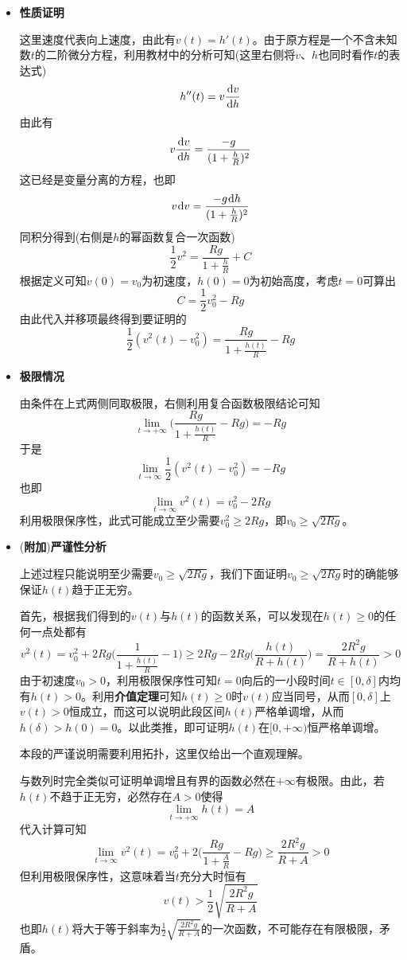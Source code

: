 \documentclass[a4paper,UTF8,fontset=windows,AutoFakeBold]{ctexart}
\newcommand*{\dr}{\hspace{0.07em}\mathrm{d}}
\newcommand*{\extra}{\textbf{附加}}
\newcommand*{\note}{\noindent *}
\theoremstyle{ex}
\begin{document}
\begin{enumerate}
{\begin{itemize}
            \item \textbf{性质证明}
            
            这里速度代表向上速度，由此有$v(t)=h'(t)$。由于原方程是一个不含未知数$t$的二阶微分方程，利用教材中的分析可知(这里右侧将$v$、$h$也同时看作$t$的表达式)
            $$h''(t)=v\frac{\dr v}{\dr h}$$
            由此有
            $$v\frac{\dr v}{\dr h}=\frac{-g}{(1+\frac{h}{R})^2}$$
            这已经是变量分离的方程，也即
            $$v\dr v=\frac{-g\dr h}{(1+\frac{h}{R})^2}$$
            同积分得到(右侧是$h$的幂函数复合一次函数)
            $$\frac{1}{2}v^2=\frac{Rg}{1+\frac{h}{R}}+C$$
            根据定义可知$v(0)=v_0$为初速度，$h(0)=0$为初始高度，考虑$t=0$可算出
            $$C=\frac{1}{2}v_0^2-Rg$$
            由此代入并移项最终得到要证明的
            $$\frac{1}{2}(v^2(t)-v_0^2)=\frac{Rg}{1+\frac{h(t)}{R}}-Rg$$

            \item \textbf{极限情况}
            
            由条件在上式两侧同取极限，右侧利用复合函数极限结论可知
            $$\lim_{t\to+\infty}\bigg(\frac{Rg}{1+\frac{h(t)}{R}}-Rg\bigg)=-Rg$$
            于是
            $$\lim_{t\to\infty}\frac{1}{2}(v^2(t)-v_0^2)=-Rg$$
            也即
            $$\lim_{t\to\infty}v^2(t)=v_0^2-2Rg$$
            利用极限保序性，此式可能成立至少需要$v_0^2\ge 2Rg$，即$v_0\ge\sqrt{2Rg}$。

            \item (\extra)\textbf{严谨性分析}
            
            上述过程只能说明至少需要$v_0\ge\sqrt{2Rg}$，我们下面证明$v_0\ge\sqrt{2Rg}$时的确能够保证$h(t)$趋于正无穷。

            首先，根据我们得到的$v(t)$与$h(t)$的函数关系，可以发现在$h(t)\ge0$的任何一点处都有
            $$v^2(t)=v_0^2+2Rg\bigg(\frac{1}{1+\frac{h(t)}{R}}-1\bigg)\ge2Rg-2Rg\bigg(\frac{h(t)}{R+h(t)}\bigg)=\frac{2R^2g}{R+h(t)}>0$$
            由于初速度$v_0>0$，利用极限保序性可知$t=0$向后的一小段时间$t\in[0,\delta]$内均有$h(t)>0$。利用\textbf{介值定理}可知$h(t)\ge0$时$v(t)$应当同号，从而$[0,\delta]$上$v(t)>0$恒成立，而这可以说明此段区间$h(t)$严格单调增，从而$h(\delta)>h(0)=0$。以此类推，即可证明$h(t)$在$[0,+\infty)$恒严格单调增。

            \note 本段的严谨说明需要利用拓扑，这里仅给出一个直观理解。

            与数列时完全类似可证明单调增且有界的函数必然在$+\infty$有极限。由此，若$h(t)$不趋于正无穷，必然存在$A>0$使得
            $$\lim_{t\to+\infty}h(t)=A$$
            代入计算可知
            $$\lim_{t\to\infty}v^2(t)=v_0^2+2\bigg(\frac{Rg}{1+\frac{A}{R}}-Rg\bigg)\ge\frac{2R^2g}{R+A}>0$$
            但利用极限保序性，这意味着当$t$充分大时恒有
            $$v(t)>\frac{1}{2}\sqrt{\frac{2R^2g}{R+A}}$$
            也即$h(t)$将大于等于斜率为$\frac{1}{2}\sqrt{\frac{2R^2g}{R+A}}$的一次函数，不可能存在有限极限，矛盾。
        \end{itemize}
    }
\end{enumerate}
\end{document}
